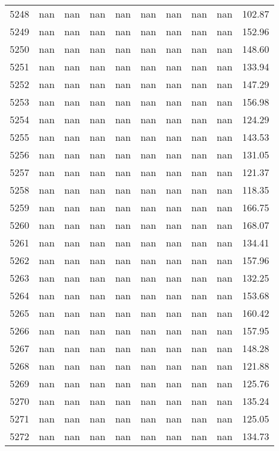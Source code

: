 \begin{tabular}{lrrrrrrrrr}
5248 & nan & nan & nan & nan & nan & nan & nan & nan & 102.87 \\
5249 & nan & nan & nan & nan & nan & nan & nan & nan & 152.96 \\
5250 & nan & nan & nan & nan & nan & nan & nan & nan & 148.60 \\
5251 & nan & nan & nan & nan & nan & nan & nan & nan & 133.94 \\
5252 & nan & nan & nan & nan & nan & nan & nan & nan & 147.29 \\
5253 & nan & nan & nan & nan & nan & nan & nan & nan & 156.98 \\
5254 & nan & nan & nan & nan & nan & nan & nan & nan & 124.29 \\
5255 & nan & nan & nan & nan & nan & nan & nan & nan & 143.53 \\
5256 & nan & nan & nan & nan & nan & nan & nan & nan & 131.05 \\
5257 & nan & nan & nan & nan & nan & nan & nan & nan & 121.37 \\
5258 & nan & nan & nan & nan & nan & nan & nan & nan & 118.35 \\
5259 & nan & nan & nan & nan & nan & nan & nan & nan & 166.75 \\
5260 & nan & nan & nan & nan & nan & nan & nan & nan & 168.07 \\
5261 & nan & nan & nan & nan & nan & nan & nan & nan & 134.41 \\
5262 & nan & nan & nan & nan & nan & nan & nan & nan & 157.96 \\
5263 & nan & nan & nan & nan & nan & nan & nan & nan & 132.25 \\
5264 & nan & nan & nan & nan & nan & nan & nan & nan & 153.68 \\
5265 & nan & nan & nan & nan & nan & nan & nan & nan & 160.42 \\
5266 & nan & nan & nan & nan & nan & nan & nan & nan & 157.95 \\
5267 & nan & nan & nan & nan & nan & nan & nan & nan & 148.28 \\
5268 & nan & nan & nan & nan & nan & nan & nan & nan & 121.88 \\
5269 & nan & nan & nan & nan & nan & nan & nan & nan & 125.76 \\
5270 & nan & nan & nan & nan & nan & nan & nan & nan & 135.24 \\
5271 & nan & nan & nan & nan & nan & nan & nan & nan & 125.05 \\
5272 & nan & nan & nan & nan & nan & nan & nan & nan & 134.73 \\

\end{tabular}
